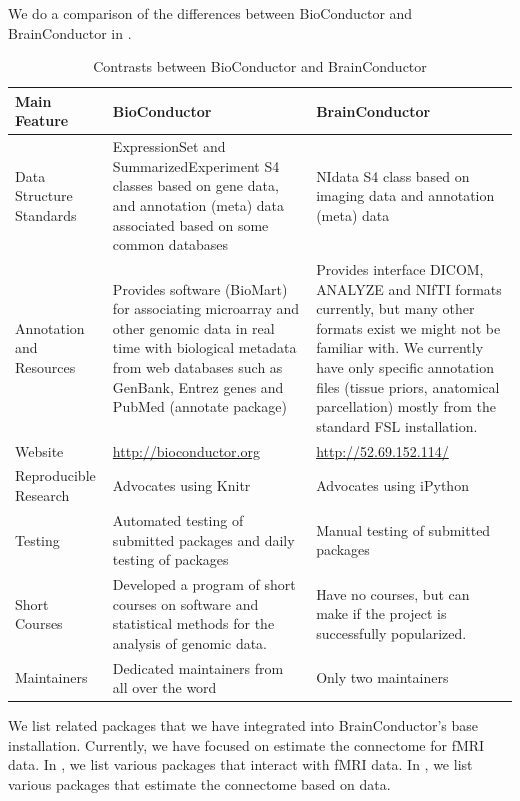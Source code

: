 \documentclass{nature}
\begin{document}
We do a comparison of the differences between BioConductor and BrainConductor
in .

\begin{table}
\begin{footnotesize}
\begin{center}
    \begin{tabular}{ | p{2cm} | p{6.5cm} |  p{6.5cm} |}
    \hline
	Main Feature & \textbf{BioConductor} & \textbf{BrainConductor} \\ \hline
	Data Structure Standards & ExpressionSet and SummarizedExperiment S4 classes based on gene data, and annotation (meta) data associated based on some common databases 
	& NIdata S4 class based on imaging data and annotation (meta) data \\\hline
	Annotation and Resources & Provides software (BioMart) for associating microarray and other genomic data in real time with biological metadata from web databases such as GenBank, Entrez genes and PubMed (annotate package) & 
	Provides interface DICOM, ANALYZE and NIfTI formats currently, but many other formats exist we
	might not be familiar with. We currently have only specific annotation files (tissue priors,
	anatomical parcellation) mostly from the standard FSL installation. \\\hline
	Website & \url{http://bioconductor.org} & \url{http://52.69.152.114/} 
	\\\hline
	Reproducible Research & Advocates using Knitr & Advocates using iPython \\\hline
	Testing & Automated testing of submitted packages and daily testing of packages & Manual testing of submitted packages \\\hline
	Short Courses & Developed a program of short courses on software and statistical methods for the analysis of genomic data. & Have no courses, but can make if the project is successfully popularized. \\\hline
	Maintainers & Dedicated maintainers from all over the word & Only two maintainers \\\hline
    \end{tabular}
    \caption{Contrasts between BioConductor and BrainConductor}
    \label{tab:bioconductor}
\end{center}
\end{footnotesize}
\end{table}

We list related packages that we have integrated into BrainConductor's 
base installation. Currently, we have focused on estimate the connectome for
fMRI data. In , we list various packages that interact with
fMRI data. In , we list various packages that estimate the connectome
based on data.
\end{document}
